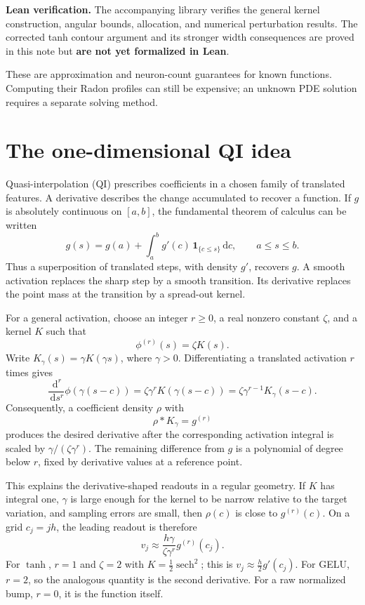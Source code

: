 \documentclass[11pt,letterpaper]{article}
\newcommand{\dd}{\,\mathrm d}
\theoremstyle{definition}
\theoremstyle{remark}
\begin{document}
\textbf{Lean verification.} The accompanying library verifies the general
kernel construction, angular bounds, allocation, and numerical perturbation
results. The corrected tanh contour argument and its stronger width
consequences are proved in this note but \textbf{are not yet formalized in Lean}.

These are approximation and neuron-count guarantees for known functions.
Computing their Radon profiles can still be expensive; an unknown PDE solution
requires a separate solving method.

\newpage
\setcounter{tocdepth}{2}
\begingroup\small\setlength{\parskip}{0pt}
\tableofcontents
\endgroup
\newpage

\section{The one-dimensional QI idea}
Quasi-interpolation (QI) prescribes coefficients in a chosen family of translated
features. A derivative describes the change accumulated to recover a function.
If \(g\) is absolutely continuous on \([a,b]\), the fundamental
theorem of calculus can be written
\[
 g(s)=g(a)+\int_a^b g'(c)\,\mathbf 1_{\{c\le s\}}\dd c,
 \qquad a\le s\le b.
\]
Thus a superposition of translated steps, with density \(g'\), recovers \(g\).
A smooth activation replaces the sharp step by a smooth transition. Its
derivative replaces the point mass at the transition by a spread-out kernel.

For a general activation, choose an integer \(r\ge0\), a real nonzero constant
\(\zeta\), and a kernel \(K\) such that
\begin{equation}\label{eq:derivative-kernel}
 \phi^{(r)}(s)=\zeta K(s).
\end{equation}
Write \(K_\gamma(s)=\gamma K(\gamma s)\), where \(\gamma>0\).
Differentiating a translated activation \(r\) times gives
\[
 \frac{\dd^r}{\dd s^r}\phi(\gamma(s-c))
   =\zeta\gamma^rK(\gamma(s-c))
   =\zeta\gamma^{r-1}K_\gamma(s-c).
\]
Consequently, a coefficient density \(\rho\) with
\[
 \rho*K_\gamma=g^{(r)}
\]
produces the desired derivative after the corresponding activation integral
is scaled by \(\gamma/(\zeta\gamma^r)\). The remaining difference from \(g\) is a
polynomial of degree below \(r\), fixed by derivative values at a reference point.

This explains the derivative-shaped readouts in a regular geometry.
If \(K\) has integral one, \(\gamma\) is large enough for the kernel to be
narrow relative to the target variation, and sampling errors are small,
then \(\rho(c)\) is close to \(g^{(r)}(c)\). On a grid \(c_j=jh\), the leading
readout is therefore
\begin{equation}\label{eq:qi-intuition}
 v_j\approx \frac{h\gamma}{\zeta\gamma^r}g^{(r)}(c_j).
\end{equation}
For \(\tanh\), \(r=1\) and \(\zeta=2\) with \(K=\tfrac12\operatorname{sech}^2\);
this is \(v_j\approx \tfrac h2g'(c_j)\).
For GELU, \(r=2\), so the analogous quantity is the second derivative.
For a raw normalized bump, \(r=0\), it is the function itself.
\end{document}

